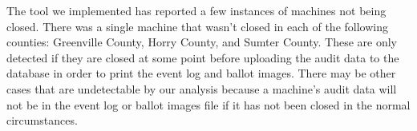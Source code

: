 The tool we implemented has reported a few instances of machines not being closed.  There was a single machine that wasn't closed in each of the following counties: Greenville County, Horry County, and Sumter County.  These are only detected if they are closed at some point before uploading the audit data to the database in order to print the event log and ballot images.  There may be other cases that are undetectable by our analysis because a machine's audit data will not be in the event log or ballot images file if it has not been closed in the normal circumstances. 
